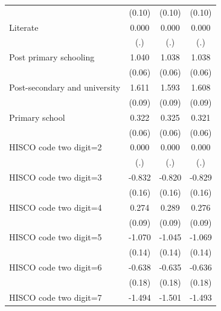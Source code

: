 {\begin{tabular}{l*{3}{c}}
                    &      (0.10)         &      (0.10)         &      (0.10)         \\
Literate            &       0.000         &       0.000         &       0.000         \\
                    &         (.)         &         (.)         &         (.)         \\
Post primary schooling&       1.040\sym{***}&       1.038\sym{***}&       1.038\sym{***}\\
                    &      (0.06)         &      (0.06)         &      (0.06)         \\
Post-secondary and university&       1.611\sym{***}&       1.593\sym{***}&       1.608\sym{***}\\
                    &      (0.09)         &      (0.09)         &      (0.09)         \\
Primary school      &       0.322\sym{***}&       0.325\sym{***}&       0.321\sym{***}\\
                    &      (0.06)         &      (0.06)         &      (0.06)         \\
HISCO code two digit=2&       0.000         &       0.000         &       0.000         \\
                    &         (.)         &         (.)         &         (.)         \\
HISCO code two digit=3&      -0.832\sym{***}&      -0.820\sym{***}&      -0.829\sym{***}\\
                    &      (0.16)         &      (0.16)         &      (0.16)         \\
HISCO code two digit=4&       0.274\sym{***}&       0.289\sym{***}&       0.276\sym{***}\\
                    &      (0.09)         &      (0.09)         &      (0.09)         \\
HISCO code two digit=5&      -1.070\sym{***}&      -1.045\sym{***}&      -1.069\sym{***}\\
                    &      (0.14)         &      (0.14)         &      (0.14)         \\
HISCO code two digit=6&      -0.638\sym{***}&      -0.635\sym{***}&      -0.636\sym{***}\\
                    &      (0.18)         &      (0.18)         &      (0.18)         \\
HISCO code two digit=7&      -1.494\sym{***}&      -1.501\sym{***}&      -1.493\sym{***}\\

\end{tabular}}

